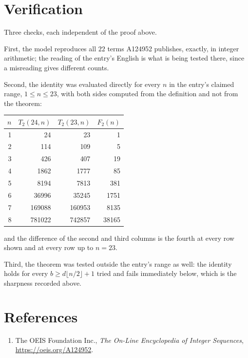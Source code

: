 \documentclass[11pt,a4paper]{article}
\theoremstyle{plain}
\theoremstyle{definition}
\begin{document}
\section{Verification}

Three checks, each independent of the proof above.

First, the model reproduces all $22$ terms A124952 publishes, exactly, in integer
arithmetic; the reading of the entry's English is what is being tested there, since a
misreading gives different counts.

Second, the identity was evaluated directly for every $n$ in the entry's claimed range,
$1\le n\le23$, with both sides computed from the definition and not from the theorem:

\begin{center}
\begin{tabular}{rrrr}
$n$ & $T_{2}(24,n)$ & $T_{2}(23,n)$ & $F_{2}(n)$ \\ \hline
1 & 24 & 23 & 1 \\
2 & 114 & 109 & 5 \\
3 & 426 & 407 & 19 \\
4 & 1862 & 1777 & 85 \\
5 & 8194 & 7813 & 381 \\
6 & 36996 & 35245 & 1751 \\
7 & 169088 & 160953 & 8135 \\
8 & 781022 & 742857 & 38165 \\
\end{tabular}
\end{center}

\noindent and the difference of the second and third columns is the fourth at every row shown
and at every row up to $n=23$.

Third, the theorem was tested outside the entry's range as well: the identity holds for every
$b\ge d\lfloor n/2\rfloor+1$ tried and fails immediately below, which is the sharpness recorded
above.

\section*{References}
\begin{enumerate}
\item The OEIS Foundation Inc., \emph{The On-Line Encyclopedia of Integer Sequences},
\url{https://oeis.org/A124952}.
\end{enumerate}
\end{document}
